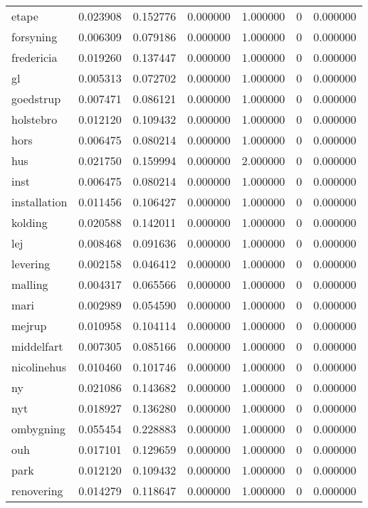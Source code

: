 \begin{landscape}
\begin{longtable}[h!]{lrrllrr}
etape & 0.023908 & 0.152776 & 0.000000 & 1.000000 & 0 & 0.000000 \\
forsyning & 0.006309 & 0.079186 & 0.000000 & 1.000000 & 0 & 0.000000 \\
fredericia & 0.019260 & 0.137447 & 0.000000 & 1.000000 & 0 & 0.000000 \\
gl & 0.005313 & 0.072702 & 0.000000 & 1.000000 & 0 & 0.000000 \\
goedstrup & 0.007471 & 0.086121 & 0.000000 & 1.000000 & 0 & 0.000000 \\
holstebro & 0.012120 & 0.109432 & 0.000000 & 1.000000 & 0 & 0.000000 \\
hors & 0.006475 & 0.080214 & 0.000000 & 1.000000 & 0 & 0.000000 \\
hus & 0.021750 & 0.159994 & 0.000000 & 2.000000 & 0 & 0.000000 \\
inst & 0.006475 & 0.080214 & 0.000000 & 1.000000 & 0 & 0.000000 \\
installation & 0.011456 & 0.106427 & 0.000000 & 1.000000 & 0 & 0.000000 \\
kolding & 0.020588 & 0.142011 & 0.000000 & 1.000000 & 0 & 0.000000 \\
lej & 0.008468 & 0.091636 & 0.000000 & 1.000000 & 0 & 0.000000 \\
levering & 0.002158 & 0.046412 & 0.000000 & 1.000000 & 0 & 0.000000 \\
malling & 0.004317 & 0.065566 & 0.000000 & 1.000000 & 0 & 0.000000 \\
mari & 0.002989 & 0.054590 & 0.000000 & 1.000000 & 0 & 0.000000 \\
mejrup & 0.010958 & 0.104114 & 0.000000 & 1.000000 & 0 & 0.000000 \\
middelfart & 0.007305 & 0.085166 & 0.000000 & 1.000000 & 0 & 0.000000 \\
nicolinehus & 0.010460 & 0.101746 & 0.000000 & 1.000000 & 0 & 0.000000 \\
ny & 0.021086 & 0.143682 & 0.000000 & 1.000000 & 0 & 0.000000 \\
nyt & 0.018927 & 0.136280 & 0.000000 & 1.000000 & 0 & 0.000000 \\
ombygning & 0.055454 & 0.228883 & 0.000000 & 1.000000 & 0 & 0.000000 \\
ouh & 0.017101 & 0.129659 & 0.000000 & 1.000000 & 0 & 0.000000 \\
park & 0.012120 & 0.109432 & 0.000000 & 1.000000 & 0 & 0.000000 \\
renovering & 0.014279 & 0.118647 & 0.000000 & 1.000000 & 0 & 0.000000 \\

\end{longtable}
\end{landscape}
